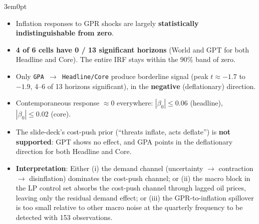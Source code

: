\documentclass[12pt]{article}
\newenvironment{bodyL2}{\begin{adjustwidth}{3em}{0pt}}{\end{adjustwidth}}
\begin{document}
\begin{bodyL2}
\smallskip
\begin{itemize}[label=$\bullet$, leftmargin=*]
    \item Inflation responses to GPR shocks are largely
\textbf{statistically indistinguishable from zero}.
    \item \textbf{4 of 6 cells have 0 / 13 significant horizons} (World and GPT for both Headline and Core). The entire IRF stays within the $90\%$ band of zero.
    \item Only \texttt{GPA $\to$ Headline/Core} produce borderline signal (peak $t \approx -1.7$ to $-1.9$, 4--6 of 13 horizons significant), in the \textbf{negative} (deflationary) direction.
    \item Contemporaneous response $\approx 0$ everywhere: $|\beta_0| \le 0.06$ (headline), $|\beta_0| \le 0.02$ (core).
    \item The slide-deck's cost-push prior (``threats inflate, acts deflate'') is \textbf{not supported}: GPT shows no effect, and GPA points in the deflationary direction for both Headline and Core.
    \item \textbf{Interpretation}: Either
(i) the demand channel (uncertainty $\to$ contraction $\to$ disinflation)
dominates the cost-push channel; or
(ii) the macro block in the LP control set absorbs the cost-push channel
through lagged oil prices, leaving only the residual demand effect; or
(iii) the GPR-to-inflation spillover is too small relative to other macro
noise at the quarterly frequency to be detected with 153 observations.
\end{itemize}
\end{bodyL2}
\end{document}
